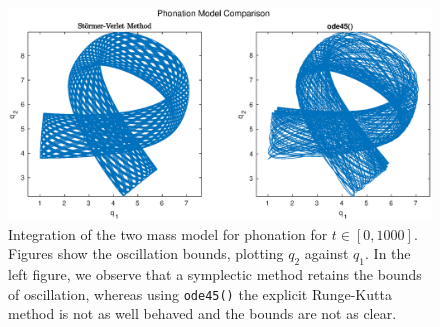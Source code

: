 \documentclass{report}
\theoremstyle{exampstyle} \newtheorem{example}[theorem]{Example}
\theoremstyle{exampstyle} \newtheorem{remark}[theorem]{Remark}
\theoremstyle{exampstyle} \newtheorem{definition}[theorem]{Definition}
\theoremstyle{exampstyle} \newtheorem{lemma}[theorem]{Lemma}
\begin{document}
\begin{figure}
	\centering
	\includegraphics[width = \linewidth]{figures/phonationcomp.eps}
	\caption{
		Integration of the two mass model for phonation for $t \in [0, 1000]$.
		Figures show the oscillation bounds, plotting $q_2$ against $q_1$.
		In the left figure, we observe that a symplectic method retains the bounds of oscillation,
		whereas using \texttt{ode45()} the explicit Runge-Kutta method is not as well behaved and the bounds are not as clear. 
	}
	\label{fig:phon}
\end{figure}
\end{document}
